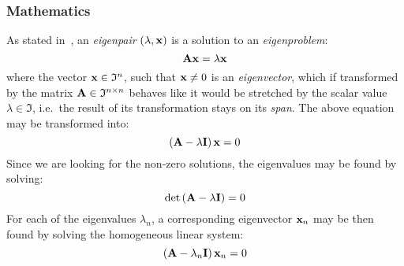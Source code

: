 \subsubsection*{Mathematics}
As stated in~\cite{Zarowski,Zdunek}, an \textit{eigenpair} $(\lambda, \mathbf{x})$ is a
solution to an \textit{eigenproblem}:
\begin{equation*}
    \mathbf{A}\mathbf{x} = \lambda\mathbf{x}
\end{equation*}
where the vector $\mathbf{x}\in\mathfrak{I}^n$, such that $\mathbf{x}\neq0$ is an
\textit{eigenvector}, which if transformed by the matrix
$\mathbf{A}\in\mathfrak{I}^{n\times{}n}$ behaves like it would be stretched by the scalar
value $\lambda\in\mathfrak{I}$, i.e.~the result of its transformation stays on its
\textit{span}.
The above equation may be transformed into:
\begin{equation*}
    \left(\mathbf{A} - \lambda\mathbf{I}\right)\mathbf{x} = 0
\end{equation*}
Since we are looking for the non-zero solutions, the eigenvalues may be found by
solving:
\begin{equation}
    \label{eq:eigen_value}
    \det{\left(\mathbf{A} - \lambda\mathbf{I}\right)} = 0
\end{equation}
For each of the eigenvalues $\lambda_n$, a corresponding eigenvector $\mathbf{x}_n$ may be
then found
by solving the homogeneous linear system:
\begin{equation}
    \label{eq:eigen_vector}
    \left(\mathbf{A} - \lambda_n\mathbf{I}\right)\mathbf{x}_n = 0
\end{equation}

